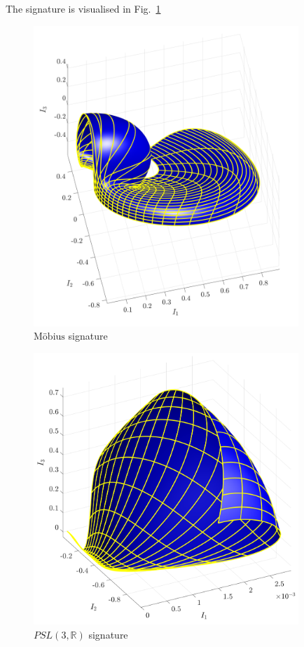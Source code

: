 \documentclass[11pt]{article}
\begin{document}
The signature is visualised in Fig.~\ref{fig:mobiussignature}
\begin{figure}
  \centering
    \includegraphics[width=10cm]{figures/mobius_signature}
    \caption{$\text{M{\"o}bius}$ signature}
  \label{fig:mobiussignature}
\end{figure}




\begin{figure}
  \centering
    \includegraphics[width=10cm]{figures/PSL3R_signature}
    \caption{$PSL(3, \mathbb{R})$ signature}
  \label{fig:psl3rsignature}
\end{figure}
\end{document}
